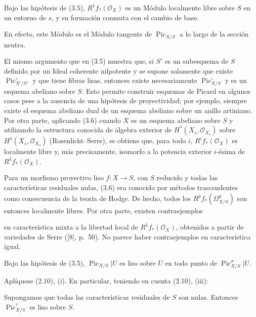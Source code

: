  Bajo las hipótesis de (3.5),
$R^1f_*(\mathcal O_X)$ es un Módulo localmente libre sobre $S$ en un entorno de
$s$, y su formación conmuta con el cambio de base.

En efecto, este Módulo es el Módulo tangente de $\operatorname{Pic}_{X/S}$ a lo largo
de la sección neutra.

 El mismo argumento que en (3.5) muestra que, si $S'$
es un subesquema de $S$ definido por un Ideal coherente nilpotente y se supone
solamente que existe $\operatorname{Pic}_{X'/S'}^\circ$ y que tiene fibras
lisas, entonces existe necesariamente $\operatorname{Pic}_{X/S}^\circ$ y es un
esquema abeliano sobre $S$. Esto permite construir esquemas de Picard en
algunos casos pese a la ausencia de una hipótesis de proyectividad; por
ejemplo, siempre existe el esquema abeliano dual de un esquema abeliano sobre
un anillo artiniano. Por otra parte, aplicando (3.6) cuando $X$ es un esquema
abeliano sobre $S$ y utilizando la estructura conocida de álgebra exterior de
$H^*(X_s,\mathcal O_{X_s})$ sobre $H^1(X_s,\mathcal O_{X_s})$
(Rosenlicht--Serre), se obtiene que, para todo $i$, $R^if_*(\mathcal O_X)$ es
localmente libre y, más precisamente, isomorfo a la potencia exterior $i$-ésima
de $R^1f_*(\mathcal O_X)$.

 Para un morfismo proyectivo liso
$f:X\longrightarrow S$, con $S$ reducido y todas las características
residuales nulas, (3.6) era conocido por métodos trascendentes como consecuencia
de la teoría de Hodge. De hecho, todos los $R^pf_*(\Omega^q_{X/S})$ son
entonces localmente libres. Por otra parte, existen contraejemplos

en característica mixta a la libertad local de $R^1f_*(\mathcal O_X)$,
obtenidos a partir de variedades de Serre ([8], p.~50). No parece haber
contraejemplos en característica igual.

 Bajo las hipótesis de (3.5),
$\operatorname{Pic}_{X/S}|U$ es liso sobre $U$ en todo punto de
$\operatorname{Pic}_{X/S}^\sigma|U$.

Aplíquese (2.10), (i). En particular, teniendo en cuenta (2.10), (iii):

 Supongamos que todas las características residuales de
$S$ son nulas. Entonces $\operatorname{Pic}_{X/S}^\tau$ es liso sobre $S$.

